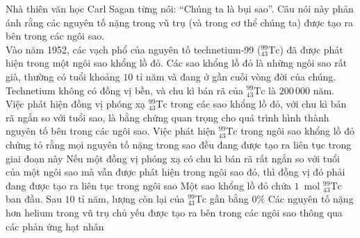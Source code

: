 	\begin{ex}%
		Nhà thiên văn học Carl Sagan từng nói: ``Chúng ta là bụi sao''. Câu nói này phản ánh rằng các nguyên tố nặng trong vũ trụ (và trong cơ thể chúng ta) được tạo ra bên trong các ngôi sao.\\
		Vào năm 1952, các vạch phổ của nguyên tố technetium-99 (${}^{99}_{43}\text{Tc}$) đã được phát hiện trong một ngôi sao khổng lồ đỏ. Các sao khổng lồ đỏ là những ngôi sao rất già, thường có tuổi khoảng $10$ tỉ năm và đang ở gần cuối vòng đời của chúng. Technetium không có đồng vị bền, và chu kì bán rã của ${}^{99}_{43}\text{Tc}$ là $200\,000$ năm.\\
		Việc phát hiện đồng vị phóng xạ ${}^{99}_{43}\text{Tc}$ trong các sao khổng lồ đỏ, với chu kì bán rã ngắn so với tuổi sao, là bằng chứng quan trọng cho quá trình hình thành nguyên tố bên trong các ngôi sao.
		\choiceTFt
		{Việc phát hiện ${}^{99}_{43}\text{Tc}$ trong ngôi sao khổng lồ đỏ chứng tỏ rằng mọi nguyên tố nặng trong sao đều đang được tạo ra liên tục trong giai đoạn này}
		{\True Nếu một đồng vị phóng xạ có chu kì bán rã rất ngắn so với tuổi của một ngôi sao mà vẫn được phát hiện trong ngôi sao đó, thì đồng vị đó phải đang được tạo ra liên tục trong ngôi sao}
		{\True Một sao khổng lồ đỏ chứa $1$~mol ${}^{99}_{43}\text{Tc}$ ban đầu. Sau $10$ tỉ năm, lượng còn lại của ${}^{99}_{43}\text{Tc}$ gần bằng $0\%$}
		{\True Các nguyên tố nặng hơn helium trong vũ trụ chủ yếu được tạo ra bên trong các ngôi sao thông qua các phản ứng hạt nhân}
	\end{ex}

